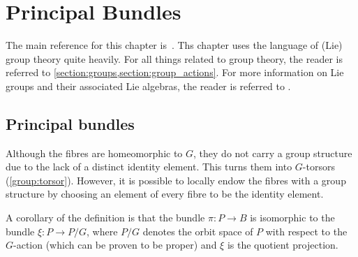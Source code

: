 \chapter{Principal Bundles}\label{chapter:principal_bundles}

    The main reference for this chapter is~\citet{sontz_principal_2015}. Ths chapter uses the language of (Lie) group theory quite heavily. For all things related to group theory, the reader is referred to \cref{section:groups,section:group_actions}. For more information on Lie groups and their associated Lie algebras, the reader is referred to .

    \minitoc

\section{Principal bundles}

    \begin{remark}[$G$-torsor]\label{bundle:fibre_torsor}
        Although the fibres are homeomorphic to $G$, they do not carry a group structure due to the lack of a distinct identity element. This turns them into $G$-torsors (\cref{group:torsor}). However, it is possible to locally endow the fibres with a group structure by choosing an element of every fibre to be the identity element.
    \end{remark}

    \begin{property}
        A corollary of the definition is that the bundle $\pi:P\rightarrow B$ is isomorphic to the bundle $\xi:P\rightarrow P/G$, where $P/G$ denotes the orbit space of $P$ with respect to the $G$-action (which can be proven to be proper) and $\xi$ is the quotient projection.
    \end{property}

